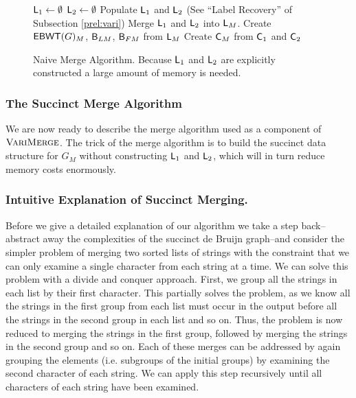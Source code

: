 \renewcommand{\algorithmiccomment}[1]{\hskip0em$\triangleright$ #1}

\begin{figure}

\begin{algorithmic}
\State $\mbox{\rm {\sf L}}_1 \leftarrow \emptyset$
\State $\mbox{\rm {\sf L}}_2 \leftarrow \emptyset$
\State Populate $\mbox{\rm {\sf L}}_1$ and $\mbox{\rm {\sf L}}_2$ (See ``Label Recovery'' of Subsection \ref{prel:vari})
\State Merge $\mbox{\rm {\sf L}}_1$ and $\mbox{\rm {\sf L}}_2$ into $\mbox{\rm {\sf L}}_M$.
\State Create  $\mathsf{EBWT}(G)_M$, $\mathsf{B}_{LM}$, $\mathsf{B}_{FM}$ from $\mbox{\rm {\sf L}}_M$
\State Create $\mbox{\rm {\sf C}}_M$ from $\mbox{\rm {\sf C}}_1$ and $\mbox{\rm {\sf C}}_2$
\end{algorithmic}
\caption{Naive Merge Algorithm.  Because $\mbox{\rm {\sf L}}_1$ and $\mbox{\rm {\sf L}}_2$ are explicitly constructed a large amount of memory is needed.}
\label{alg:naive_alg}
\end{figure}




\subsubsection{The Succinct Merge Algorithm}

We are now ready to describe the merge algorithm used as a component of $\mbox{\rm {\sc VariMerge}}$.  The trick of the merge algorithm is to build the succinct data structure for $G_M$  without constructing $\mbox{\rm {\sf L}}_1$ and $\mbox{\rm {\sf L}}_2$, which will in turn reduce memory costs enormously.


\subsubsection{Intuitive Explanation of Succinct Merging.}
Before we give a detailed explanation of our algorithm we take a step back--abstract away the complexities of the succinct de Bruijn graph--and consider the simpler problem of merging two sorted lists of strings with the constraint that we can only examine a single character from each string at a time.  We can solve this problem with a divide and conquer approach.  First, we group all the strings in each list by their first character.  This partially solves the problem, as we know all the strings in the first group from each list must occur in the output before all the strings in the second group in each list and so on.  Thus, the problem is now reduced to merging the strings in the first group, followed by merging the strings in the second group and so on.  Each of these merges can be addressed by again grouping the elements (i.e. subgroups of the initial groups) by examining the second character of each string.  We can apply this step recursively until all characters of each string have been examined.

